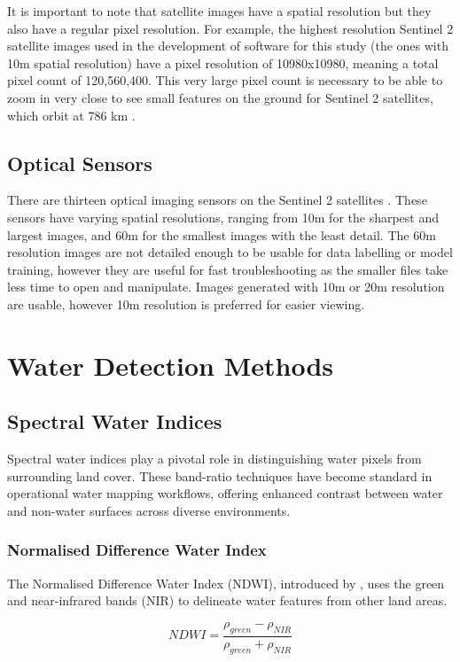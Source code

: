 It is important to note that satellite images have a spatial resolution but they also have a regular pixel resolution. For example, the highest resolution Sentinel 2 satellite images used in the development of software for this study (the ones with 10m spatial resolution) have a pixel resolution of 10980x10980, meaning a total pixel count of 120,560,400. This very large pixel count is necessary to be able to zoom in very close to see small features on the ground for Sentinel 2 satellites, which orbit at 786 km \citep{esa_2023}. 

\subsection{Optical Sensors}
There are thirteen optical imaging sensors on the Sentinel 2 satellites \citep{sinergise_2025}. These sensors have varying spatial resolutions, ranging from 10m for the sharpest and largest images, and 60m for the smallest images with the least detail. The 60m resolution images are not detailed enough to be usable for data labelling or model training, however they are useful for fast troubleshooting as the smaller files take less time to open and manipulate. Images generated with 10m or 20m resolution are usable, however 10m resolution is preferred for easier viewing. 

\section{Water Detection Methods}
\subsection{Spectral Water Indices}
Spectral water indices play a pivotal role in distinguishing water pixels from surrounding land cover. These band-ratio techniques have become standard in operational water mapping workflows, offering enhanced contrast between water and non-water surfaces across diverse environments. 

\subsubsection{Normalised Difference Water Index}
The Normalised Difference Water Index (NDWI), introduced by \cite{mcfeeters_k_1996}, uses the green and near-infrared bands (NIR) to delineate water features from other land areas. 

\begin{equation} \label{eq-ndwi}
NDWI = \frac{\rho_{green} - \rho_{NIR}}{\rho_{green} + \rho_{NIR}}
\end{equation}

